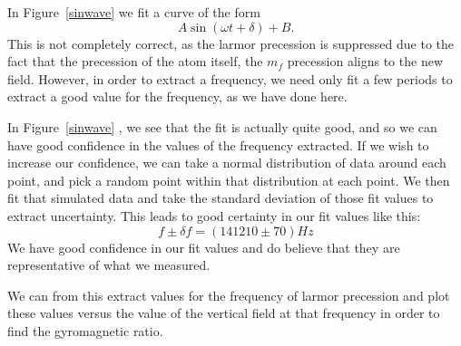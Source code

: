 \documentclass{article}
\begin{document}
    In Figure~\ref{sinwave} we fit a curve of the form
    \begin{equation*}
      A\sin(\omega t + \delta) + B.
    \end{equation*}
    This is not completely correct, as the larmor precession is suppressed due to the fact that the precession of the atom itself, the $m_f$ precession aligns to the new field.  However, in order to extract a frequency, we need only fit a few periods to extract a good value for the frequency, as we have done here.

    \hspace{.25cm}

    In Figure~\ref{sinwave} , we see that the fit is actually quite good, and so we can have good confidence in the values of the frequency extracted.  If we wish to increase our confidence, we can take a normal distribution of data around each point, and pick a random point within that distribution at each point.  We then fit that simulated data and take the standard deviation of those fit values to extract uncertainty.  This leads to good certainty in our fit values like this:
    \begin{equation}
      f \pm \delta f = (141210 \pm 70) Hz
      \label{freq_sample}
    \end{equation}
    We have good confidence in our fit values and do believe that they are representative of what we measured.

    We can from this extract values for the frequency of larmor precession and plot these values versus the value of the vertical field at that frequency in order to find the gyromagnetic ratio.

    \hspace{.25cm}
\end{document}
